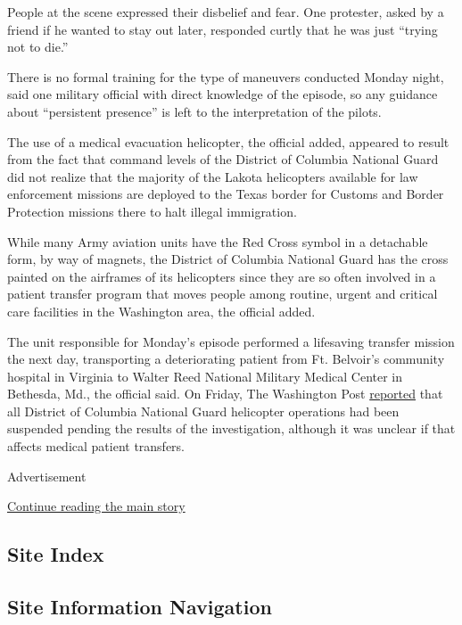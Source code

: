 People at the scene expressed their disbelief and fear. One protester,
asked by a friend if he wanted to stay out later, responded curtly that
he was just ``trying not to die.''

There is no formal training for the type of maneuvers conducted Monday
night, said one military official with direct knowledge of the episode,
so any guidance about ``persistent presence'' is left to the
interpretation of the pilots.

The use of a medical evacuation helicopter, the official added, appeared
to result from the fact that command levels of the District of Columbia
National Guard did not realize that the majority of the Lakota
helicopters available for law enforcement missions are deployed to the
Texas border for Customs and Border Protection missions there to halt
illegal immigration.

While many Army aviation units have the Red Cross symbol in a detachable
form, by way of magnets, the District of Columbia National Guard has the
cross painted on the airframes of its helicopters since they are so
often involved in a patient transfer program that moves people among
routine, urgent and critical care facilities in the Washington area, the
official added.

The unit responsible for Monday's episode performed a lifesaving
transfer mission the next day, transporting a deteriorating patient from
Ft. Belvoir's community hospital in Virginia to Walter Reed National
Military Medical Center in Bethesda, Md., the official said. On Friday,
The Washington Post
\href{https://www.washingtonpost.com/national-security/pentagon-disarms-guardsmen-in-washington-dc-in-signal-of-de-escalation/2020/06/05/324da91a-a733-11ea-8681-7d471bf20207_story.html}{reported}
that all District of Columbia National Guard helicopter operations had
been suspended pending the results of the investigation, although it was
unclear if that affects medical patient transfers.

Advertisement

\protect\hyperlink{after-bottom}{Continue reading the main story}

\hypertarget{site-index}{%
\subsection{Site Index}\label{site-index}}

\hypertarget{site-information-navigation}{%
\subsection{Site Information
Navigation}\label{site-information-navigation}}


